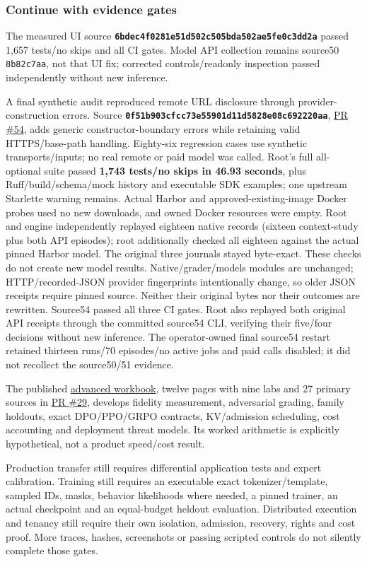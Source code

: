 \documentclass[
  11pt,
  letterpaper,
]{article}
\begin{document}
\subsubsection{Continue with evidence
gates}\label{continue-with-evidence-gates}

The measured UI source
\textbf{\texttt{6bdec4f0281e51d502c505bda502ae5fe0c3dd2a}} passed 1,657
tests/no skips and all CI gates. Model API collection remains source50
\texttt{8b82c7aa}, not that UI fix; corrected controls/readonly
inspection passed independently without new inference.

A final synthetic audit reproduced remote URL disclosure through
provider-construction errors. Source
\textbf{\texttt{0f51b903cfcc73e55901d11d5828e08c692220aa}},
\href{https://github.com/nthpaul/world-engine/pull/54}{PR \#54}, adds
generic constructor-boundary errors while retaining valid
HTTPS/base-path handling. Eighty-six regression cases use synthetic
transports/inputs; no real remote or paid model was called. Root's full
all-optional suite passed \textbf{1,743 tests/no skips in 46.93
seconds}, plus Ruff/build/schema/mock history and executable SDK
examples; one upstream Starlette warning remains. Actual Harbor and
approved-existing-image Docker probes used no new downloads, and owned
Docker resources were empty. Root and engine independently replayed
eighteen native records (sixteen context-study plus both API episodes);
root additionally checked all eighteen against the actual pinned Harbor
model. The original three journals stayed byte-exact. These checks do
not create new model results. Native/grader/models modules are
unchanged; HTTP/recorded-JSON provider fingerprints intentionally
change, so older JSON receipts require pinned source. Neither their
original bytes nor their outcomes are rewritten. Source54 passed all
three CI gates. Root also replayed both original API receipts through
the committed source54 CLI, verifying their five/four decisions without
new inference. The operator-owned final source54 restart retained
thirteen runs/70 episodes/no active jobs and paid calls disabled; it did
not recollect the source50/51 evidence.

The published \href{advanced-environment-labs.pdf}{advanced workbook},
twelve pages with nine labs and 27 primary sources in
\href{https://github.com/nthpaul/world-engine/pull/29}{PR \#29},
develops fidelity measurement, adversarial grading, family holdouts,
exact DPO/PPO/GRPO contracts, KV/admission scheduling, cost accounting
and deployment threat models. Its worked arithmetic is explicitly
hypothetical, not a product speed/cost result.

Production transfer still requires differential application tests and
expert calibration. Training still requires an executable exact
tokenizer/template, sampled IDs, masks, behavior likelihoods where
needed, a pinned trainer, an actual checkpoint and an equal-budget
heldout evaluation. Distributed execution and tenancy still require
their own isolation, admission, recovery, rights and cost proof. More
traces, hashes, screenshots or passing scripted controls do not silently
complete those gates.
\end{document}
